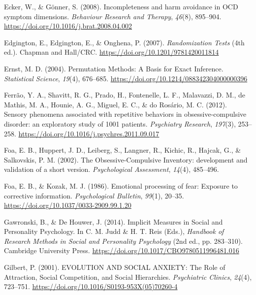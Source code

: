 \documentclass[
  man,floatsintext]{apa7}
\newlength{\cslhangindent}
\newlength{\cslentryspacingunit} %
\newenvironment{CSLReferences}[2] %
 {%
  \setlength{\parindent}{0pt}
  \ifodd #1
  \let\oldpar\par
  \def\par{\hangindent=\cslhangindent\oldpar}
  \fi
  \setlength{\parskip}{#2\cslentryspacingunit}
 }%
 {}
\begin{document}
\begin{CSLReferences}{1}{0}
\leavevmode{}%
Ecker, W., \& Gönner, S. (2008). Incompleteness and harm avoidance in OCD symptom dimensions. \emph{Behaviour Research and Therapy}, \emph{46}(8), 895--904. \url{https://doi.org/10.1016/j.brat.2008.04.002}

\leavevmode{}%
Edgington, E., Edgington, E., \& Onghena, P. (2007). \emph{Randomization Tests} (4th ed.). Chapman and Hall/CRC. \url{https://doi.org/10.1201/9781420011814}

\leavevmode{}%
Ernst, M. D. (2004). Permutation Methods: A Basis for Exact Inference. \emph{Statistical Science}, \emph{19}(4), 676--685. \url{https://doi.org/10.1214/088342304000000396}

\leavevmode{}%
Ferrão, Y. A., Shavitt, R. G., Prado, H., Fontenelle, L. F., Malavazzi, D. M., de Mathis, M. A., Hounie, A. G., Miguel, E. C., \& do Rosário, M. C. (2012). Sensory phenomena associated with repetitive behaviors in obsessive-compulsive disorder: an exploratory study of 1001 patients. \emph{Psychiatry Research}, \emph{197}(3), 253--258. \url{https://doi.org/10.1016/j.psychres.2011.09.017}

\leavevmode{}%
Foa, E. B., Huppert, J. D., Leiberg, S., Langner, R., Kichic, R., Hajcak, G., \& Salkovskis, P. M. (2002). The Obsessive-Compulsive Inventory: development and validation of a short version. \emph{Psychological Assessment}, \emph{14}(4), 485--496.

\leavevmode{}%
Foa, E. B., \& Kozak, M. J. (1986). Emotional processing of fear: Exposure to corrective information. \emph{Psychological Bulletin}, \emph{99}(1), 20--35. \url{https://doi.org/10.1037/0033-2909.99.1.20}

\leavevmode{}%
Gawronski, B., \& De Houwer, J. (2014). Implicit Measures in Social and Personality Psychology. In C. M. Judd \& H. T. Reis (Eds.), \emph{Handbook of Research Methods in Social and Personality Psychology} (2nd ed., pp. 283--310). Cambridge University Press. \url{https://doi.org/10.1017/CBO9780511996481.016}

\leavevmode{}%
Gilbert, P. (2001). EVOLUTION AND SOCIAL ANXIETY: The Role of Attraction, Social Competition, and Social Hierarchies. \emph{Psychiatric Clinics}, \emph{24}(4), 723--751. \url{https://doi.org/10.1016/S0193-953X(05)70260-4}


\end{CSLReferences}
\end{document}
